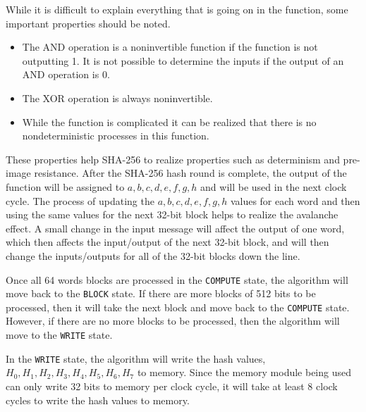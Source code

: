 \documentclass{article}
\begin{document}
While it is difficult to explain everything that is going on in the function, some important properties should be noted.
\begin{itemize}
  \item The AND operation is a noninvertible function if the function is not outputting 1. It is not possible to determine the inputs if the output of an AND operation is 0.
  \item The XOR operation is always noninvertible.
  \item While the function is complicated it can be realized that there is no nondeterministic processes in this function.
\end{itemize}
These properties help SHA-256 to realize properties such as determinism and pre-image resistance. After the SHA-256 hash round is complete, the output of the function will be assigned to $a,b,c,d,e,f,g,h$ and will be used in the next clock cycle. The process of updating the $a,b,c,d,e,f,g,h$ values for each word and then using the same values for the next 32-bit block helps to realize the avalanche effect. A small change in the input message will affect the output of one word, which then affects the input/output of the next 32-bit block, and will then change the inputs/outputs for all of the 32-bit blocks down the line.

Once all 64 words blocks are processed in the \verb|COMPUTE| state, the algorithm will move back to the \verb|BLOCK| state. If there are more blocks of 512 bits to be processed, then it will take the next block and move back to the \verb|COMPUTE| state. However, if there are no more blocks to be processed, then the algorithm will move to the \verb|WRITE| state.

In the \verb|WRITE| state, the algorithm will write the hash values, $H_0, H_1, H_2, H_3, H_4, H_5, H_6, H_7$ to memory. Since the memory module being used can only write 32 bits to memory per clock cycle, it will take at least 8 clock cycles to write the hash values to memory.

\end{document}
